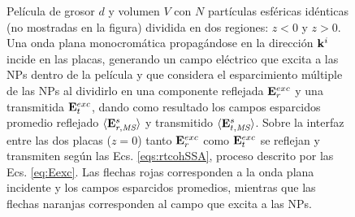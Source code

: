 \begin{figure}[h!]
	\caption{ Película de grosor $d$ y volumen $V$ con $N$ partículas esféricas idénticas (no mostradas en la figura) dividida en dos regiones: $z<0$ y $z>0$. Una onda plana monocromática propagándose en la dirección $\vb{k}^i$ incide en las placas, generando un campo eléctrico que excita a las NPs dentro de la película y que considera el esparcimiento múltiple de las NPs al dividirlo en una componente reflejada $\vb{E}^{exc}_r$ y una transmitida $\vb{E}^{exc}_t$, dando como resultado los campos esparcidos promedio reflejado $\langle\vb{E}_{r,\textit{MS}}^s\rangle$ y transmitido $\langle\vb{E}_{t,\textit{MS}}^s\rangle$. Sobre la interfaz entre las dos placas ($z=0$) tanto $\vb{E}^{exc}_r$ como $\vb{E}^{exc}_t$ se reflejan y transmiten según las Ecs. \eqref{eqs:rtcohSSA}, proceso descrito por las Ecs. \eqref{eq:Eexc}. Las flechas rojas corresponden a la onda plana incidente y los campos esparcidos promedios, mientras que las flechas naranjas corresponden al campo que excita a las NPs. }\label{fig:Eexc}
	\end{figure}	
	
